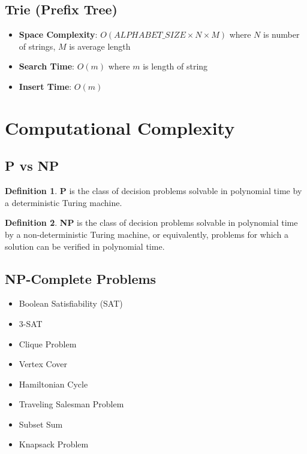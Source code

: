\documentclass[11pt]{article}
\theoremstyle{definition}
\newtheorem{definition}{Definition}[section]
\begin{document}
\subsection{Trie (Prefix Tree)}
\begin{itemize}
    \item \textbf{Space Complexity}: $O(ALPHABET\_SIZE \times N \times M)$ where $N$ is number of strings, $M$ is average length
    \item \textbf{Search Time}: $O(m)$ where $m$ is length of string
    \item \textbf{Insert Time}: $O(m)$
\end{itemize}

\section{Computational Complexity}

\subsection{P vs NP}
\begin{definition}
\textbf{P} is the class of decision problems solvable in polynomial time by a deterministic Turing machine.
\end{definition}

\begin{definition}
\textbf{NP} is the class of decision problems solvable in polynomial time by a non-deterministic Turing machine, or equivalently, problems for which a solution can be verified in polynomial time.
\end{definition}

\subsection{NP-Complete Problems}
\begin{itemize}
    \item Boolean Satisfiability (SAT)
    \item 3-SAT
    \item Clique Problem
    \item Vertex Cover
    \item Hamiltonian Cycle
    \item Traveling Salesman Problem
    \item Subset Sum
    \item Knapsack Problem
\end{itemize}
\end{document}
